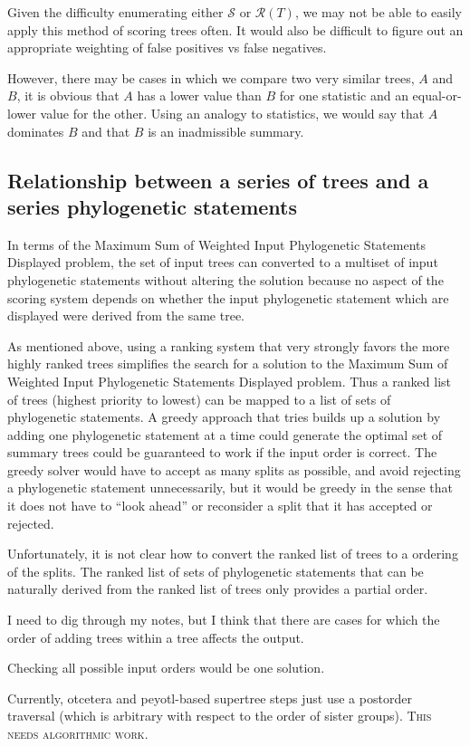 \documentclass[11pt]{article}
\newcommand{\ps}{phylogenetic statement\xspace}
\newcommand{\pss}{phylogenetic statements\xspace}
\newcommand{\PSs}{Phylogenetic Statements\xspace}
\newcommand{\SWIPSD}{Sum of Weighted Input \PSs Displayed\xspace}
\newcommand{\MSWIPSD}{Maximum \SWIPSD \xspace}
\newcommand{\comment}[1]{{\color{red} \textsc{#1}}\xspace}
\newcommand{\NeedsAlgorithmicWork}{{\comment{This needs algorithmic work.}}}
\begin{document}
Given the difficulty enumerating either $\mathcal{S}$ or $\mathcal{R}(T)$, we may not be able to easily 
    apply this method of scoring trees often.
It would also be difficult to figure out an appropriate weighting of false positives vs false negatives.

However, there may be cases in which we compare two very similar trees, $A$ and $B$, it is obvious
    that $A$ has a lower value than $B$ for one statistic and an equal-or-lower value for the other.
Using an analogy to statistics, we would say that $A$ dominates $B$ and that $B$ is an inadmissible summary.

\subsection{Relationship between a series of trees and a series \pss}\label{orderPSsTheory}
In terms of the \MSWIPSD problem, the set of input trees can converted to a multiset of input \pss without 
    altering the solution because no aspect of the scoring system depends on whether the input \ps
    which are displayed were derived from the same tree.

As mentioned above, using a ranking system that very strongly favors the more highly ranked trees
    simplifies the search for a solution to the \MSWIPSD problem.
Thus a ranked list of trees (highest priority to lowest) can be mapped to a list of sets of \pss.
A greedy approach that tries builds up a solution by adding one \ps at a time could generate the optimal
    set of summary trees could be guaranteed to work if the input order is correct.
The greedy solver would have to accept as many splits as possible, and avoid rejecting a \ps unnecessarily,
    but it would be greedy in the sense that it does not have to ``look ahead'' or reconsider a split
    that it has accepted or rejected.

Unfortunately, it is not clear how to convert the ranked list of trees to a ordering of the splits.
The ranked list of sets of \pss that can be naturally derived from the ranked list of trees only provides
    a partial order.

I need to dig through my notes, but I think that there are cases for which the order of adding trees within
    a tree affects the output.

Checking all possible input orders would be one solution. 

Currently, otcetera and peyotl-based supertree steps just use a postorder traversal (which is arbitrary with
    respect to the order of sister groups). \NeedsAlgorithmicWork
\end{document}
